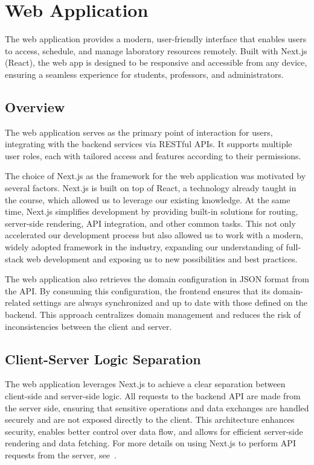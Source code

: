 \section{Web Application}

The web application provides a modern, user-friendly interface that enables users to access, schedule, and manage laboratory resources remotely. Built with Next.js (React), the web app is designed to be responsive and accessible from any device, ensuring a seamless experience for students, professors, and administrators.

\subsection{Overview}
The web application serves as the primary point of interaction for users, integrating with the backend services via RESTful APIs. It supports multiple user roles, each with tailored access and features according to their permissions.

The choice of Next.js as the framework for the web application was motivated by several factors. Next.js is built on top of React, a technology already taught in the course, which allowed us to leverage our existing knowledge. At the same time, Next.js simplifies development by providing built-in solutions for routing, server-side rendering, API integration, and other common tasks. This not only accelerated our development process but also allowed us to work with a modern, widely adopted framework in the industry, expanding our understanding of full-stack web development and exposing us to new possibilities and best practices.

The web application also retrieves the domain configuration in JSON format from the API. By consuming this configuration, the frontend ensures that its domain-related settings are always synchronized and up to date with those defined on the backend. This approach centralizes domain management and reduces the risk of inconsistencies between the client and server.

\subsection{Client-Server Logic Separation}

The web application leverages Next.js to achieve a clear separation between client-side and server-side logic. All requests to the backend API are made from the server side, ensuring that sensitive operations and data exchanges are handled securely and are not exposed directly to the client. This architecture enhances security, enables better control over data flow, and allows for efficient server-side rendering and data fetching. For more details on using Next.js to perform API requests from the server, see~\cite{auth0-nextjs-server-actions}.

